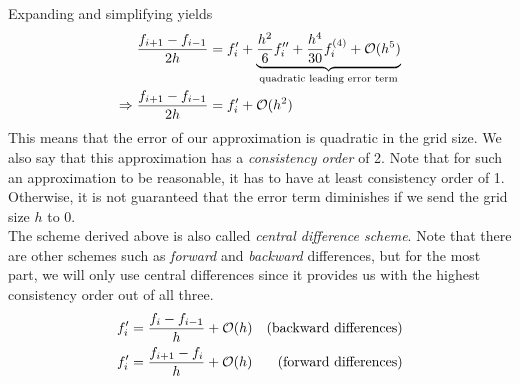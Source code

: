 Expanding and simplifying yields
\begin{align}
        \frac{f_{i+1} - f_{i-1}}{2h} &= f_i' + \underbrace{\frac{h^2}{6}f_i'' +
            \frac{h^4}{30}f_i^{(4)} +
        \mathcal{O}(h^5)}_\text{quadratic leading error term}\notag\\
            \Rightarrow \frac{f_{i+1} - f_{i-1}}{2h} &= f_i' + \mathcal{O}(h^2)
\end{align}
This means that the error of our approximation is quadratic in the grid size. 
We also say that this approximation has a \textit{consistency order} of 2. Note that for such an
approximation to be reasonable, it has to have at least consistency order of 1. Otherwise, it is
not guaranteed that the error term diminishes if we send the grid size $h$ to 0.\\
The scheme derived above is also called \textit{central difference scheme}. Note that there are
other schemes such as \textit{forward} and \textit{backward} differences, but for the most part, we
will only use central differences since it provides us with the highest consistency
order out of all three. 
\begin{align}
    f_i' &= \frac{f_i - f_{i-1}}{h} + \mathcal{O}(h)&\textnormal{(backward differences)}\notag\\
    f_i' &= \frac{f_{i+1} - f_i}{h} + \mathcal{O}(h)&\textnormal{(forward differences)}\notag
\end{align}
